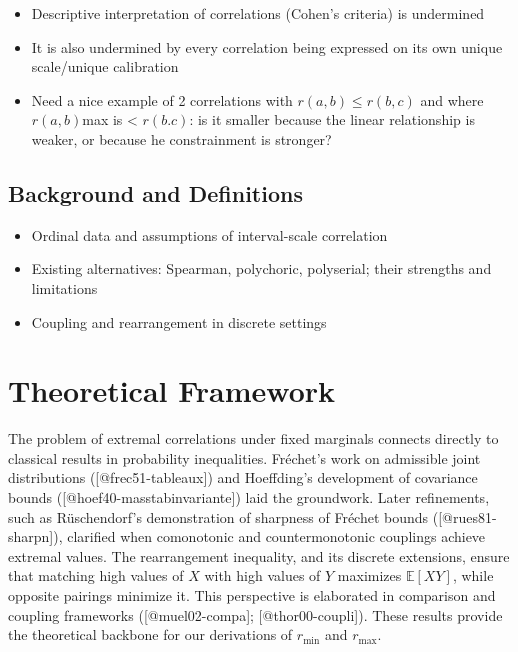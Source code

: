 \documentclass[
  12pt,
]{article}
\providecommand{\tightlist}{%
  \setlength{\itemsep}{0pt}\setlength{\parskip}{0pt}}
\theoremstyle{plain}
\theoremstyle{definition}
\theoremstyle{remark}
\begin{document}
\begin{itemize}
\tightlist
\item
  Descriptive interpretation of correlations (Cohen's criteria) is
  undermined
\item
  It is also undermined by every correlation being expressed on its own
  unique scale/unique calibration
\item
  Need a nice example of 2 correlations with \(r(a,b) \le r(b,c)\) and
  where \(r(a,b)\)max is \textless{} \(r(b.c)\): is it smaller because
  the linear relationship is weaker, or because he constrainment is
  stronger?
\end{itemize}

\subsection{Background and
Definitions}\label{background-and-definitions}

\begin{itemize}
\tightlist
\item
  Ordinal data and assumptions of interval-scale correlation\\
\item
  Existing alternatives: Spearman, polychoric, polyserial; their
  strengths and limitations\\
\item
  Coupling and rearrangement in discrete settings
\end{itemize}

\section{Theoretical Framework}\label{theoretical-framework}

The problem of extremal correlations under fixed marginals connects directly to classical results in probability inequalities. Fréchet’s work on admissible joint distributions ([@frec51-tableaux]) and Hoeffding’s development of covariance bounds ([@hoef40-masstabinvariante]) laid the groundwork. Later refinements, such as Rüschendorf’s demonstration of sharpness of Fréchet bounds ([@rues81-sharpn]), clarified when comonotonic and countermonotonic couplings achieve extremal values. The rearrangement inequality, and its discrete extensions, ensure that matching high values of \( X \) with high values of \( Y \) maximizes \(\mathbb{E}[XY]\), while opposite pairings minimize it. This perspective is elaborated in comparison and coupling frameworks ([@muel02-compa]; [@thor00-coupli]). These results provide the theoretical backbone for our derivations of \(r_{\min}\) and \(r_{\max}\).
\end{document}
